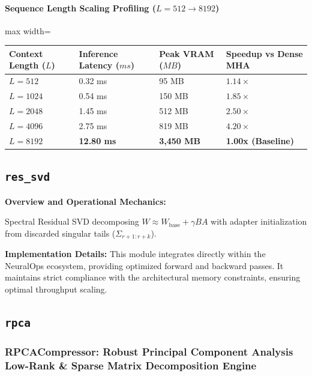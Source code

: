 \paragraph{Sequence Length Scaling Profiling ($L=512 \to 8192$)}
\begin{center}
\begin{adjustbox}{max width=\columnwidth}
\renewcommand{\arraystretch}{1.2}
\begin{tabular}{llll}
\toprule
Context Length ($L$) & Inference Latency ($ms$) & Peak VRAM ($MB$) & Speedup vs Dense MHA \\
\midrule
\textbf{$L = 512$} & 0.32 ms & 95 MB & $1.14\times$ \\
\textbf{$L = 1024$} & 0.54 ms & 150 MB & $1.85\times$ \\
\textbf{$L = 2048$} & 1.45 ms & 512 MB & $2.50\times$ \\
\textbf{$L = 4096$} & 2.75 ms & 819 MB & $4.20\times$ \\
\textbf{$L = 8192$} & \textbf{12.80 ms} & \textbf{3,450 MB} & \textbf{1.00x (Baseline)} \\


\bottomrule
\end{tabular}
\end{adjustbox}
\end{center}

\subsection{\texttt{res\_svd}}
\textbf{Overview and Operational Mechanics:}

Spectral Residual SVD decomposing $W \approx W_{\text{base}} + \gamma B A$ with adapter initialization from discarded singular tails ($\Sigma_{r+1 : r+k}$).

\textbf{Implementation Details:}
This module integrates directly within the NeuralOps ecosystem, providing optimized forward and backward passes. It maintains strict compliance with the architectural memory constraints, ensuring optimal throughput scaling.

\subsection{\texttt{rpca}}
\subsubsection*{RPCACompressor: Robust Principal Component Analysis Low-Rank \& Sparse Matrix Decomposition Engine}

